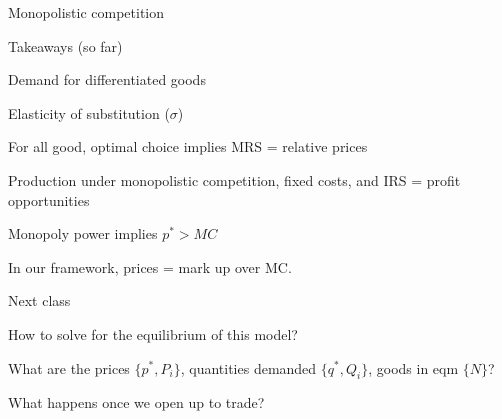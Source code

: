 \documentclass[notes,11pt, aspectratio=169, xcolor=table]{beamer}
\newenvironment{wideitemize}{\itemize\addtolength{\itemsep}{10pt}}{\enditemize}
\begin{document}
\begin{frame}{Monopolistic competition}

 \end{frame}

\begin{frame}{Takeaways (so far)}
\begin{wideitemize}
    \item Demand for differentiated goods
    \item Elasticity of substitution ($\sigma$)
    \item For all good, optimal choice implies MRS = relative prices
    \item Production under monopolistic competition, fixed costs, and IRS = profit opportunities
    \item Monopoly power implies $p^* > MC$
    \item In our framework, prices = mark up over MC.
    \end{wideitemize}
 \end{frame}

\begin{frame}{Next class}
\begin{wideitemize}
    \item How to solve for the equilibrium of this model?
    \item What are the prices $\{p^*, P_i\}$, quantities demanded $\{q^*,Q_i\}$, goods in eqm $\{N\}$?
    \item What happens once we open up to trade?
    \end{wideitemize}
 \end{frame}



\end{document}
